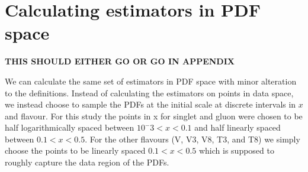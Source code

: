 \section{Calculating estimators in PDF space}

{\bf THIS SHOULD EITHER GO OR GO IN APPENDIX}

We can calculate the same set of estimators in PDF space with minor alteration
to the definitions. Instead of calculating the estimators on points in data space,
we instead choose to sample the PDFs at the initial scale at discrete intervals
in $x$ and flavour. For this study the
points in x for singlet and gluon were chosen to be half logarithmically spaced
between $10^-3<x<0.1$ and half linearly spaced between $0.1<x<0.5$. For the
other flavours (V, V3, V8, T3, and T8) we simply choose the points to be
linearly spaced $0.1<x<0.5$ which is supposed to roughly capture the data region
of the PDFs.

